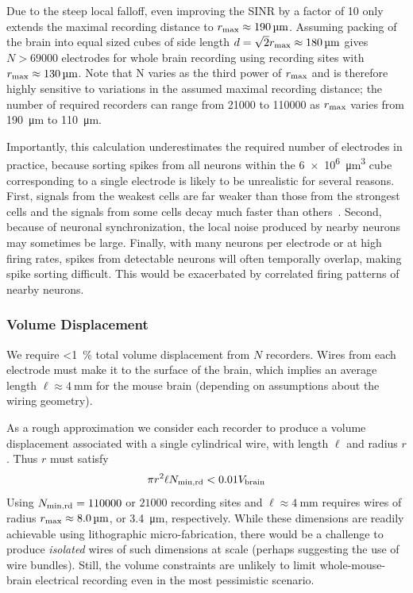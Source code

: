 Due to the steep local falloff, even improving the SINR by a factor of 10 only extends the maximal recording distance to $r_{\text{\scriptsize max}} \approx \SI{190}{\micro\meter}$. Assuming packing of the brain into equal sized cubes of side length $d = \sqrt{2}r_{\text{\scriptsize max}} \approx \SI{180}{\micro\meter}$ gives $N > 69000$ electrodes for whole brain recording using recording sites with $r_{\text{\scriptsize max}} \approx \SI{130}{\micro\meter}$. Note that N varies as the third power of $r_{\text{\scriptsize max}}$ and is therefore highly sensitive to variations in the assumed maximal recording distance; the number of required recorders can range from 21000 to 110000 as $r_{\text{\scriptsize max}}$ varies from \SI{190}{\micro\meter} to \SI{110}{\micro\meter}.

Importantly, this calculation underestimates the required number of electrodes in practice, because sorting spikes from all neurons within the \SI{6e6}{\micro\meter\cubed} cube corresponding to a single electrode is likely to be unrealistic for several reasons.
First, signals from the weakest cells are far weaker than those from the strongest cells and the signals from some cells decay much faster than others~\cite{gray95}.
Second, because of neuronal synchronization, the local noise produced by nearby neurons may sometimes be large. 
Finally, with many neurons per electrode or at high firing rates, spikes from detectable neurons will often temporally overlap, making spike sorting difficult.
This would be exacerbated by correlated firing patterns of nearby neurons.

\subsubsection{Volume Displacement}

We require \SI{<1}{\percent} total volume displacement from $N$ recorders.
Wires from each electrode must make it to the surface of the brain, which implies an average length $\ell\approx\SI{4}{\milli\meter}$ for the mouse brain (depending on assumptions about the wiring geometry).

As a rough approximation we consider each recorder to produce a volume displacement associated with a single cylindrical wire, with length $\ell$ and radius $r$.
Thus $r$ must satisfy \[\pi r^2\ell N_{\text{\scriptsize min,rd}} < 0.01V_{\text{\scriptsize brain}}\]
Using $N_{\text{\scriptsize min,rd}} = 110000$ or $21000$ recording sites and $\ell\approx\SI{4}{\milli\meter}$ requires wires of radius $r_{\text{\scriptsize max}} \approx \SI{8.0}{\micro\meter}$, or \SI{3.4}{\micro\meter}, respectively.
While these dimensions are readily achievable using lithographic micro-fabrication, there would be a challenge to produce \emph{isolated} wires of such dimensions at scale (perhaps suggesting the use of wire bundles).
Still, the volume constraints are unlikely to limit whole-mouse-brain electrical recording even in the most pessimistic scenario.

